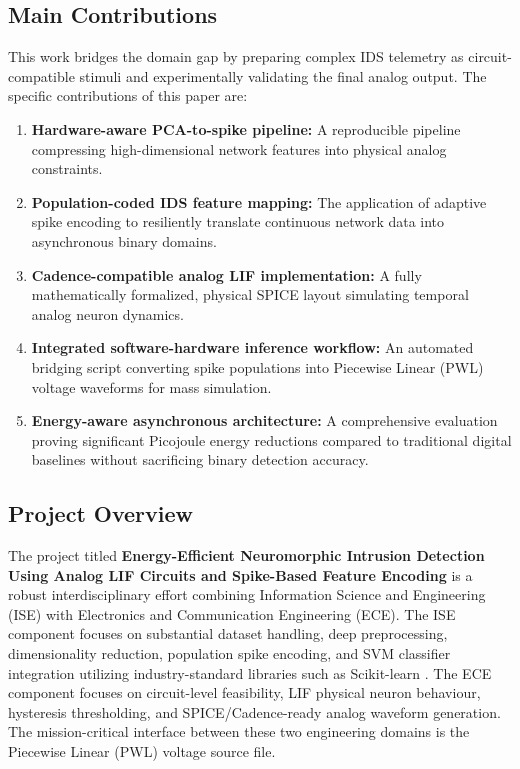\documentclass{ieeeaccess}
\begin{document}
\subsection{Main Contributions}
This work bridges the domain gap by preparing complex IDS telemetry as circuit-compatible stimuli and experimentally validating the final analog output. The specific contributions of this paper are:
\begin{enumerate}
\item \textbf{Hardware-aware PCA-to-spike pipeline:} A reproducible pipeline compressing high-dimensional network features into physical analog constraints.
\item \textbf{Population-coded IDS feature mapping:} The application of adaptive spike encoding to resiliently translate continuous network data into asynchronous binary domains.
\item \textbf{Cadence-compatible analog LIF implementation:} A fully mathematically formalized, physical SPICE layout simulating temporal analog neuron dynamics.
\item \textbf{Integrated software-hardware inference workflow:} An automated bridging script converting spike populations into Piecewise Linear (PWL) voltage waveforms for mass simulation.
\item \textbf{Energy-aware asynchronous architecture:} A comprehensive evaluation proving significant Picojoule energy reductions compared to traditional digital baselines without sacrificing binary detection accuracy.
\end{enumerate}

\subsection{Project Overview}
The project titled \textbf{Energy-Efficient Neuromorphic Intrusion Detection Using Analog LIF Circuits and Spike-Based Feature Encoding} is a robust interdisciplinary effort combining Information Science and Engineering (ISE) with Electronics and Communication Engineering (ECE). The ISE component focuses on substantial dataset handling, deep preprocessing, dimensionality reduction, population spike encoding, and SVM classifier integration utilizing industry-standard libraries such as Scikit-learn \cite{Pedregosa2011}. The ECE component focuses on circuit-level feasibility, LIF physical neuron behaviour, hysteresis thresholding, and SPICE/Cadence-ready analog waveform generation. The mission-critical interface between these two engineering domains is the Piecewise Linear (PWL) voltage source file.
\end{document}
